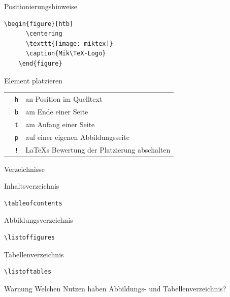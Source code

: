 \begin{Frame}[fragile]{Positionierungshinweise}
  \begin{lstlisting}[gobble=4]
    \begin{figure}[htb]
      \centering
      \texttt{[image: miktex]}
      \caption{Mik\TeX-Logo}
    \end{figure}
  \end{lstlisting}

  \xxx

  Element platzieren
  
  \begin{tabular}{lr@{ }l}
    & \lstinline-h- & an Position im Quelltext \\
    & \lstinline-b- & am Ende einer Seite \\
    & \lstinline-t- & am Anfang einer Seite \\
    & \lstinline-p- & auf einer eigenen Abbildungsseite \\
    & \lstinline-!- & \LaTeX s Bewertung der Platzierung abschalten
  \end{tabular}
\end{Frame}

\begin{Frame}[fragile]{Verzeichnisse}
  \begin{Block}{Inhaltsverzeichnis}
    \begin{lstlisting}[gobble=6,style=block]
      \tableofcontents
    \end{lstlisting}
  \end{Block}

  \begin{Block}{Abbildungsverzeichnis}
    \begin{lstlisting}[gobble=6,style=block]
      \listoffigures
    \end{lstlisting}
  \end{Block}

  \begin{Block}{Tabellenverzeichnis}
    \begin{lstlisting}[gobble=6,style=block]
      \listoftables
    \end{lstlisting}
  \end{Block}

  \xxx

  \begin{alertblock}{Warnung}
    Welchen Nutzen haben Abbildungs- und Tabellenverzeichnis?
  \end{alertblock}
\end{Frame}

